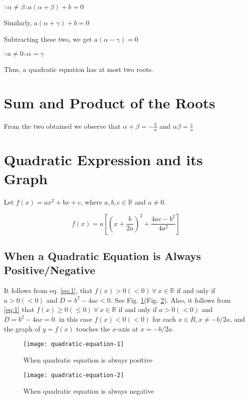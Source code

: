 $\because \alpha \neq \beta \therefore a(\alpha + \beta) + b = 0$

Similarly, $a(\alpha + \gamma) + b = 0$

Subtracting these two, we get $a(\alpha - \gamma) = 0$

$\because a\neq 0 \therefore \alpha = \gamma$

Thus, a quadratic equation has at most two roots.

\section{Sum and Product of the Roots}
From the two obtained  we observe that $\alpha + \beta = -\frac{b}{a}$ and $\alpha\beta = \frac{c}{a}$

\section{Quadratic Expression and its Graph}
Let $f(x) = ax^2 + bx + c$, where $a, b, c\in\mathbb{R}$ and $a\neq 0$.

\begin{equation}
  \label{eq:1}
  f(x) = a\left[\left(x + \frac{b}{2a}\right)^2 + \frac{4ac - b^2}{4a^2}\right]
\end{equation}

\subsection{When a Quadratic Equation is Always Positive/Negative}
It follows from eq. \ref{eq:1}, that $f(x) > 0(< 0)~\forall~x\in\mathbb{R}$ if and only if $a > 0(< 0)$ and $D = b^2 - 4ac <
0$. See Fig. \ref{fig:1}(Fig. \ref{fig:2}). Also, it follows from \ref{eq:1} that $f(x) \geq 0(\leq 0)~\forall~x\in\mathbb{R}$ if
and only if $a > 0(< 0)$ and $D = b^2 - 4ac = 0$. in this case $f(x) < 0(< 0)$ for each $x\in R, x\neq -b/2a$, and the graph of $y
= f(x)$ touches the $x$-axis at $x = -b/2a$.

\begin{figure}[H]
  \begin{center}
    \texttt{[image: quadratic-equation-1]}
    \caption{When quadratic equation is always positive}
    \label{fig:1}
  \end{center}
\end{figure}

\begin{figure}[H]
  \begin{center}
    \texttt{[image: quadratic-equation-2]}
    \caption{When quadratic equation is always negative}
    \label{fig:2}
  \end{center}
\end{figure}

